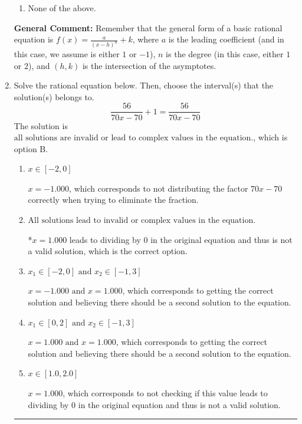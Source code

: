 \documentclass{extbook}[14pt]
\newcommand{\litem}[1]{\item #1

\rule{\textwidth}{0.4pt}}
\begin{document}
\begin{enumerate}
{\begin{enumerate}[label=\Alph*.]
\item None of the above.\end{enumerate}
\textbf{General Comment:} Remember that the general form of a basic rational equation is $ f(x) = \frac{a}{(x-h)^n} + k$, where $a$ is the leading coefficient (and in this case, we assume is either $1$ or $-1$), $n$ is the degree (in this case, either $1$ or $2$), and $(h, k)$ is the intersection of the asymptotes.
}
\litem{
Solve the rational equation below. Then, choose the interval(s) that the solution(s) belongs to.
\[ \frac{56}{70x -70} + 1 = \frac{56}{70x -70} \]The solution is \( \text{all solutions are invalid or lead to complex values in the equation.} \), which is option B.\begin{enumerate}[label=\Alph*.]
\item \( x \in [-2,0] \)

$x = -1.000$, which corresponds to not distributing the factor $70x -70$ correctly when trying to eliminate the fraction.
\item \( \text{All solutions lead to invalid or complex values in the equation.} \)

*$x = 1.000$ leads to dividing by 0 in the original equation and thus is not a valid solution, which is the correct option.
\item \( x_1 \in [-2, 0] \text{ and } x_2 \in [-1,3] \)

$x = -1.000 \text{ and } x = 1.000$, which corresponds to getting the correct solution and believing there should be a second solution to the equation.
\item \( x_1 \in [0, 2] \text{ and } x_2 \in [-1,3] \)

$x = 1.000 \text{ and } x = 1.000$, which corresponds to getting the correct solution and believing there should be a second solution to the equation.
\item \( x \in [1.0,2.0] \)

$x = 1.000$, which corresponds to not checking if this value leads to dividing by 0 in the original equation and thus is not a valid solution.
\end{enumerate}

}
\end{enumerate}
\end{document}
